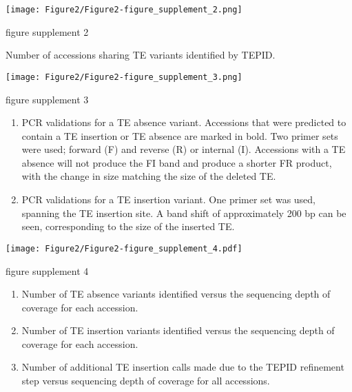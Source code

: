 \documentclass[12pt]{article}
\begin{document}
\pagebreak
\setcounter{suppfigure}{1}

\begin{suppfigure}
  \centering
  \texttt{[image: Figure2/Figure2-figure\_supplement\_2.png]}
  \caption{figure supplement 2}
  \label{fig2s2}
\end{suppfigure}

Number of accessions sharing TE variants identified by TEPID.

\pagebreak
\setcounter{suppfigure}{1}

\begin{suppfigure}
  \centering
  \texttt{[image: Figure2/Figure2-figure\_supplement\_3.png]}
  \caption{figure supplement 3}
  \label{fig2s3}
\end{suppfigure}

\begin{enumerate}
  \def\labelenumi{(\Alph{enumi})}
\item
  PCR validations for a TE absence variant. Accessions that were
  predicted to contain a TE insertion or TE absence are marked in bold.
  Two primer sets were used; forward (F) and reverse (R) or internal
  (I). Accessions with a TE absence will not produce the FI band and
  produce a shorter FR product, with the change in size matching the
  size of the deleted TE.
\item
  PCR validations for a TE insertion variant. One primer set was used,
  spanning the TE insertion site. A band shift of approximately 200 bp
  can be seen, corresponding to the size of the inserted TE.
\end{enumerate}

\pagebreak

\setcounter{suppfigure}{1}

\begin{suppfigure}
  \centering
  \texttt{[image: Figure2/Figure2-figure\_supplement\_4.pdf]}
  \caption{figure supplement 4}
  \label{fig2s4}
\end{suppfigure}

\begin{enumerate}
  \def\labelenumi{(\Alph{enumi})}
\item
  Number of TE absence variants identified versus the sequencing depth
  of coverage for each accession.
\item
  Number of TE insertion variants identified versus the sequencing depth
  of coverage for each accession.
\item
  Number of additional TE insertion calls made due to the TEPID
  refinement step versus sequencing depth of coverage for all
  accessions.
\end{enumerate}
\end{document}
